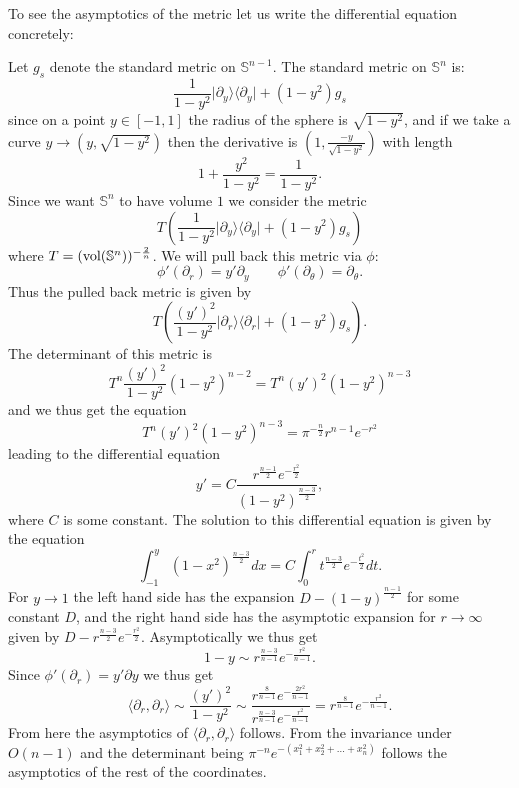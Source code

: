 \documentclass[letterpaper,11pt]{article}
\newcommand{\pa}{\partial}
\begin{document}
To see the asymptotics of the metric let us write the differential equation concretely: 


Let $g_{s}$ denote the standard metric on $\mathbb{S}^{n-1}$. 
The standard metric on $\mathbb{S}^{n}$ is:
$$
\frac{1}{1-y^2} \vert \pa_y \rangle \langle \pa_y \vert + (1-y^2) g_{s}
$$
since on a point $y\in [-1,1]$ the radius of the sphere is $\sqrt{1-y^2}$, and if we take a curve $y\rightarrow (y,\sqrt{1-y^2})$ then the derivative is $(1,\frac{-y}{\sqrt{1-y^2}})$ with length
$$
1+ \frac{y^2}{1-y^2} = \frac{1}{1-y^2}.
$$
Since we want $\mathbb{S}^{n}$ to have volume $1$ we consider the metric
$$
T\left(\frac{1}{1-y^2} \vert \pa_y \rangle \langle \pa_y \vert + (1-y^2) g_{s}\right)
$$
where $T=(\hbox{vol}(\mathbb{S}^{n}))^{-\frac{2}{n}}$.
We will pull back this metric via $\phi$:
$$
\phi'(\pa_r) = y' \pa_y\qquad \phi'(\pa_\theta) = \pa_\theta.
$$
Thus the pulled back metric is given by
$$
T\left( \frac{(y')^2}{1-y^2} \vert \pa_r \rangle \langle \pa_r \vert + (1-y^2) g_{s} \right).
$$
The determinant of this metric is
$$
T^n\frac{(y')^2}{1-y^2} (1-y^2)^{n-2} =T^n (y')^2(1-y^2)^{n-3}
$$
and we thus get the equation
\begin{equation}
T^n(y')^2(1-y^2)^{n-3} =\pi^{-\frac{n}{2}} r^{n-1}e^{-r^2}
\label{zzzz}
\end{equation}
leading to the differential equation
$$
y' = C \frac{r^{\frac{n-1}{2}} e^{-\frac{r^2}{2}}}{(1-y^2)^{\frac{n-3}{2}}},
$$
where $C$ is some constant. The solution to this differential equation is given by the equation
$$
\int_{-1}^y (1-x^2)^{\frac{n-3}{2}} dx =  C\int_0^r t^{\frac{n-3}{2}} e^{-\frac{t^2}{2}} dt.
$$
For $y \to 1$ the left hand side has the expansion $D-(1-y)^{\frac{n-1}{2}}$ for some constant $D$, and the right hand side has the asymptotic expansion 
for $r\to \infty$ given by $D-r^{\frac{n-3}{2}} e^{-\frac{r^2}{2}}$. Asymptotically we thus get 
$$1-y \sim  r^{\frac{n-3}{n-1}} e^{-\frac{r^2}{n-1}}.$$
Since $\phi' (\partial_r)=y'\partial y$ we thus get 
$$\langle \partial_r ,\partial_r \rangle \sim  \frac{(y')^2}{1-y^2} \sim \frac{r^{\frac{8}{n-1}}e^{-\frac{2r^2}{n-1}}}{r^{\frac{n-3}{n-1}} e^{-\frac{r^2}{n-1}}} =r^{\frac{8}{n-1}}e^{-\frac{r^2}{n-1}} .$$
From here the asymptotics of $\langle \partial_r ,\partial_r \rangle$ follows. From the invariance under $O(n-1)$ and the determinant being $\pi^{-n}e^{-(x_1^2+x_2^2+\ldots +x_n^2)}$ follows the asymptotics of the rest of the coordinates.
\end{document}
